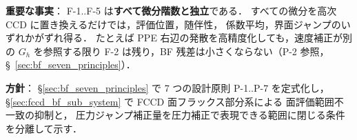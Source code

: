 \noindent\textbf{重要な事実}：
F-1..F-5 は\textbf{すべて微分階数と独立}である．
すべての微分を高次 CCD に置き換えるだけでは，評価位置，随伴性，
係数平均，界面ジャンプのいずれかがずれ得る．
たとえば PPE 右辺の発散を高精度化しても，速度補正が別の $G_h$ を参照する限り
F-2 は残り，BF 残差は小さくならない（P-2 参照，§~\ref{sec:bf_seven_principles}）．

\noindent\textbf{方針}：
§\ref{sec:bf_seven_principles} で 7 つの設計原則 P-1..P-7 を定式化し，
§\ref{sec:fccd_bf_sub_system} で FCCD 面フラックス部分系による
面評価範囲不一致の抑制と，
圧力ジャンプ補正量を圧力補正で表現できる範囲に閉じる条件を分離して示す．

